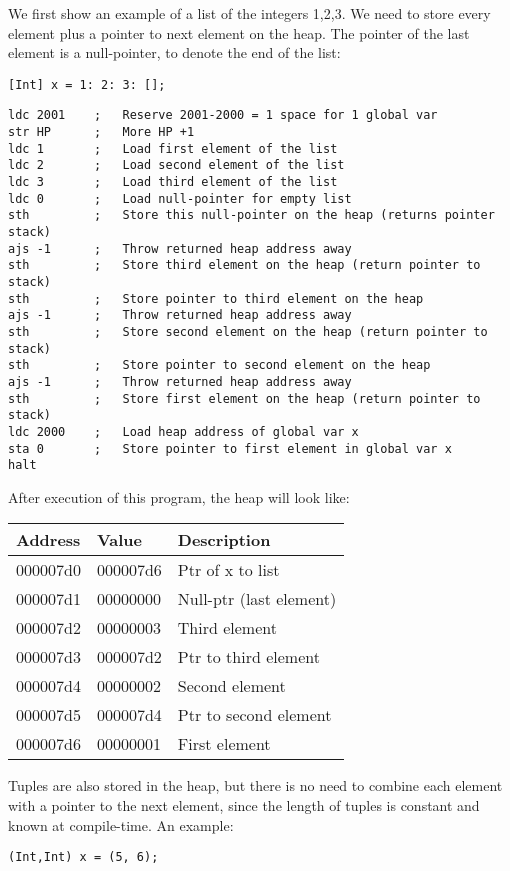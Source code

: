 \documentclass[a4paper]{article}
\begin{document}
We first show an example of a list of the integers 1,2,3. We need to store every element plus a pointer to next element on the heap. The pointer of the last element is a null-pointer, to denote the end of the list:
\begin{lstlisting}
[Int] x = 1: 2: 3: [];
\end{lstlisting}
\begin{lstlisting}
ldc 2001	;	Reserve 2001-2000 = 1 space for 1 global var
str HP		;	More HP +1
ldc 1		;	Load first element of the list
ldc 2		;	Load second element of the list
ldc 3		;	Load third element of the list
ldc 0		;	Load null-pointer for empty list
sth			;	Store this null-pointer on the heap (returns pointer stack)
ajs -1		;	Throw returned heap address away
sth			;	Store third element on the heap (return pointer to stack)
sth			;	Store pointer to third element on the heap
ajs -1		;	Throw returned heap address away
sth			;	Store second element on the heap (return pointer to stack)
sth			;	Store pointer to second element on the heap
ajs -1		;	Throw returned heap address away
sth			;	Store first element on the heap (return pointer to stack)
ldc 2000	;	Load heap address of global var x
sta 0		;	Store pointer to first element in global var x
halt
\end{lstlisting}
After execution of this program, the heap will look like:

\begin{tabular}{|l|l|l|}
	\hline
	Address & Value & Description \\
	\hline
	000007d0 & 000007d6 & Ptr of x to list \\
	000007d1 & 00000000 & Null-ptr (last element) \\
	000007d2 & 00000003 & Third element  \\
	000007d3 & 000007d2 & Ptr to third element  \\
	000007d4 & 00000002 & Second element  \\
	000007d5 & 000007d4 & Ptr to second element  \\
	000007d6 & 00000001 & First element  \\
	\hline
\end{tabular}

Tuples are also stored in the heap, but there is no need to combine each element with a pointer to the next element, since the length of tuples is constant and known at compile-time. An example:
\begin{lstlisting}
(Int,Int) x = (5, 6);
\end{lstlisting}
\end{document}
